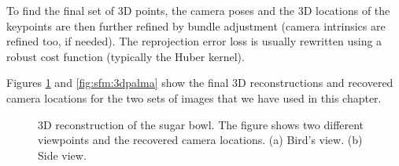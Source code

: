 To find the final set of 3D points,  the camera poses and the 3D locations of the keypoints are then further refined by bundle adjustment (camera intrinsics are refined too, if needed). The reprojection error loss is usually rewritten using a robust cost function (typically the Huber kernel).

Figures \ref{fig:sfm:3dsugar} and \ref{fig:sfm:3dpalma} show the final 3D reconstructions and recovered camera locations for the two sets of images that we have used in this chapter.  


\begin{figure}
\centerline{
}
\caption{3D reconstruction of the sugar bowl. The figure shows two different viewpoints and the recovered camera locations. (a) Bird's view. (b) Side view.}
\label{fig:sfm:3dsugar}
\end{figure}




